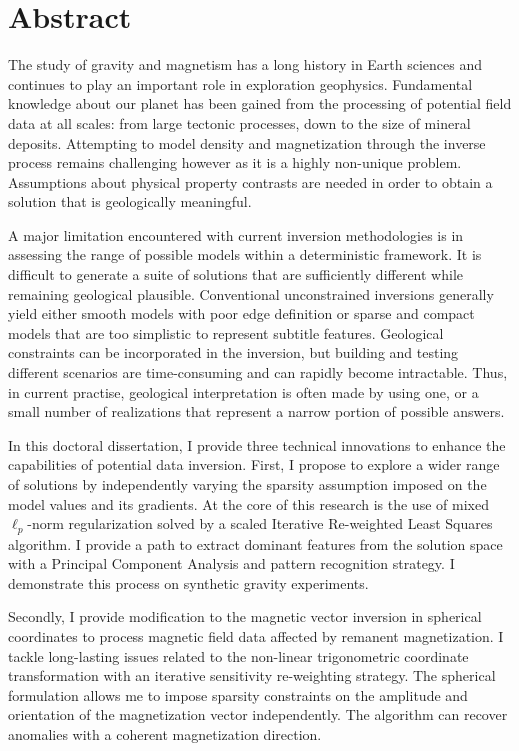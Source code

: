 
\chapter{Abstract}
The study of gravity and magnetism has a long history in Earth sciences and continues to play an important role in exploration geophysics.
Fundamental knowledge about our planet has been gained from the processing of potential field data at all scales: from large tectonic processes, down to the size of mineral deposits. Attempting to model density and magnetization through the inverse process remains challenging however as it is a highly non-unique problem. Assumptions about physical property contrasts are needed in order to obtain a solution that is geologically meaningful.

A major limitation encountered with current inversion methodologies is in assessing the range of possible models within a deterministic framework. It is difficult to generate a suite of solutions that are sufficiently different while remaining geological plausible. Conventional unconstrained inversions generally yield either smooth models with poor edge definition or sparse and compact models that are too simplistic to represent subtitle features. Geological constraints can be incorporated in the inversion, but building and testing different scenarios are time-consuming and can rapidly become intractable. Thus, in current practise, geological interpretation is often made by using one, or a small number of realizations that represent a narrow portion of possible answers.

In this doctoral dissertation, I provide three technical innovations to enhance the capabilities of potential data inversion. First, I propose to explore a wider range of solutions by independently varying the sparsity assumption imposed on the model values and its gradients. At the core of this research is the use of mixed $\ell_p$-norm regularization solved by a scaled Iterative Re-weighted Least Squares algorithm. I provide a path to extract dominant features from the solution space with a Principal Component Analysis and pattern recognition strategy. I demonstrate this process on synthetic gravity experiments.

Secondly, I provide modification to the magnetic vector inversion in spherical coordinates to process magnetic field data affected by remanent magnetization. I tackle long-lasting issues related to the non-linear trigonometric coordinate transformation with an iterative sensitivity re-weighting strategy. The spherical formulation allows me to impose sparsity constraints on the amplitude and orientation of the magnetization vector independently. The algorithm can recover anomalies with a coherent magnetization direction.

